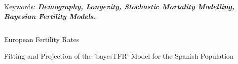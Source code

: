\documentclass[]{beamer}
\begin{document}
\begin{frame}{\vspace{1ex}\hfill Keywords: \bfseries \textit{Demography, Longevity, Stochastic Mortality Modelling, Bayesian Fertility Models.}}
\begin{columns}[t]
\begin{block}{European Fertility Rates}
\begin{minipage}{.98\columnwidth}
\begin{block}{Fitting and Projection of the ’bayesTFR’ Model for the Spanish Population}
\begin{figure}[h]
\end{figure}
\end{block}
\end{minipage}
\vspace{-1.75cm}
		\end{block}
		
		\vspace{-0.5cm}

\end{columns}
\end{frame}
\end{document}
